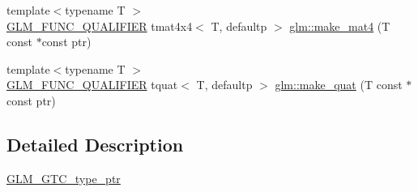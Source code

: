 \begin{DoxyCompactItemize}
\item 
{\footnotesize template$<$typename T $>$ }\\\mbox{\hyperlink{setup_8hpp_a33fdea6f91c5f834105f7415e2a64407}{G\+L\+M\+\_\+\+F\+U\+N\+C\+\_\+\+Q\+U\+A\+L\+I\+F\+I\+ER}} tmat4x4$<$ T, defaultp $>$ \mbox{\hyperlink{group__gtc__type__ptr_ga2c6e6d457cb932e1ce683e4f690a6f60}{glm\+::make\+\_\+mat4}} (T const $\ast$const ptr)
\item 
{\footnotesize template$<$typename T $>$ }\\\mbox{\hyperlink{setup_8hpp_a33fdea6f91c5f834105f7415e2a64407}{G\+L\+M\+\_\+\+F\+U\+N\+C\+\_\+\+Q\+U\+A\+L\+I\+F\+I\+ER}} tquat$<$ T, defaultp $>$ \mbox{\hyperlink{group__gtc__type__ptr_gaadafb6600af2633e4c98cc64c72f5269}{glm\+::make\+\_\+quat}} (T const $\ast$const ptr)
\end{DoxyCompactItemize}


\subsection{Detailed Description}
\mbox{\hyperlink{group__gtc__type__ptr}{G\+L\+M\+\_\+\+G\+T\+C\+\_\+type\+\_\+ptr}} 